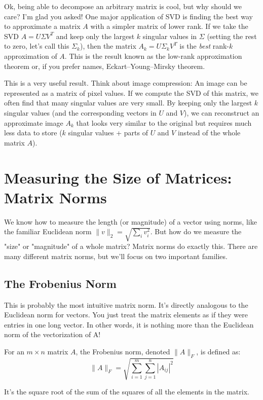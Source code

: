 \documentclass[11pt]{article}
\begin{document}
Ok, being able to decompose an arbitrary matrix is cool, but why should we care? I'm glad you asked! One major application of SVD is finding the best way to approximate a matrix $A$ with a simpler matrix of lower rank. If we take the SVD $A = U \Sigma V^T$ and keep only the largest $k$ singular values in $\Sigma$ (setting the rest to zero, let's call this $\Sigma_k$), then the matrix $A_k = U \Sigma_k V^T$ is the \textit{best} rank-$k$ approximation of $A$. This is the result known as the low-rank approximation theorem or, if you prefer names, Eckart–Young–Mirsky theorem.

This is a very useful result. Think about image compression: An image can be represented as a matrix of pixel values. If we compute the SVD of this matrix, we often find that many singular values are very small. By keeping only the largest $k$ singular values (and the corresponding vectors in $U$ and $V$), we can reconstruct an approximate image $A_k$ that looks very similar to the original but requires much less data to store ($k$ singular values + parts of $U$ and $V$ instead of the whole matrix $A$).

\section{Measuring the Size of Matrices: Matrix Norms}
We know how to measure the length (or magnitude) of a vector using norms, like the familiar Euclidean norm $\|v\|_2 = \sqrt{\sum_i v_i^2}$. But how do we measure the "size" or "magnitude" of a whole matrix? Matrix norms do exactly this. 
There are many different matrix norms, but we'll focus on two important families.

\subsection{The Frobenius Norm}
This is probably the most intuitive matrix norm. It's directly analogous to the Euclidean norm for vectors. You just treat the matrix elements as if they were entries in one long vector. In other words, it is nothing more than the Euclidean norm of the vectorization of A!

\begin{definition}
    For an $m \times n$ matrix $A$, the Frobenius norm, denoted $\|A\|_F$, is defined as:
\[
\|A\|_F = \sqrt{\sum_{i=1}^m \sum_{j=1}^n |A_{ij}|^2}
\]
\end{definition} 
It's the square root of the sum of the squares of all the elements in the matrix.
\end{document}
